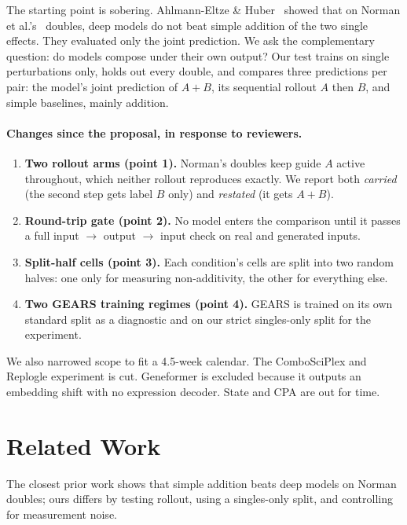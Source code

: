 \documentclass[11pt]{article}
\begin{document}
The starting point is sobering. Ahlmann-Eltze \& Huber~\cite{ahlmann} showed that on Norman
et al.'s~\cite{norman} doubles, deep models do not beat simple addition of the two single
effects. They evaluated only the joint prediction. We ask the complementary question: do
models compose under their own output? Our test trains on single perturbations only, holds
out every double, and compares three predictions per pair: the model's joint prediction of
$A{+}B$, its sequential rollout $A$ then $B$, and simple baselines, mainly addition.

\paragraph{Changes since the proposal, in response to reviewers.}
\begin{enumerate}
  \item \textbf{Two rollout arms (point 1).} Norman's doubles keep guide $A$ active
  throughout, which neither rollout reproduces exactly. We report both \emph{carried} (the
  second step gets label $B$ only) and \emph{restated} (it gets $A{+}B$).
  \item \textbf{Round-trip gate (point 2).} No model enters the comparison until it passes a
  full input $\to$ output $\to$ input check on real and generated inputs.
  \item \textbf{Split-half cells (point 3).} Each condition's cells are split into two
  random halves: one only for measuring non-additivity, the other for everything else.
  \item \textbf{Two GEARS training regimes (point 4).} GEARS is trained on its own standard
  split as a diagnostic and on our strict singles-only split for the experiment.
\end{enumerate}
We also narrowed scope to fit a 4.5-week calendar. The ComboSciPlex and Replogle experiment
is cut. Geneformer is excluded because it outputs an embedding shift with no expression
decoder. State and CPA are out for time.

\section{Related Work}

The closest prior work shows that simple addition beats deep models on Norman doubles; ours
differs by testing rollout, using a singles-only split, and controlling for measurement
noise.
\end{document}
